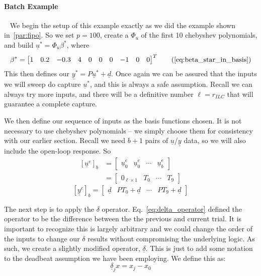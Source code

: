 \FloatBarrier\paragraph{Batch Example}
~\label{par:batch_ex}
We begin the setup of this example exactly as we did the example shown in~\ref{par:fipo}. So we set $p=100$, create a $\Phi_u$ of the first 10 chebyshev polynomials, and build $\underline{u}^\ast = \Phi_u \beta^\ast$, where
\begin{equation}
    \beta^\ast = {\begin{bmatrix}1 & 0.2 & -0.3 & 4 & 0 & 0 & 0 & -1 & 0 & 0\end{bmatrix}}^T
    \tag{\ref{eq:beta_star_in_basis}}
\end{equation}
This then defines our $\underline{y}^\ast = P\underline{u}^\ast + \underline{d}$. Once again we can be assured that the inputs we will sweep do capture $\underline{u}^\ast$, and this is always a safe assumption. Recall we can always try more inputs, and there will be a definitive number $\ell = r_{ILC}$ that will guarantee a complete capture.

We then define our sequence of inputs as the basis functions chosen. It is not necessary to use chebyshev polynomials -- we simply choose them for consistency with our earlier section. Recall we need $b+1$ pairs of $\underline{u}$/$\underline{y}$ data, so we will also include the open-loop response. So
\begin{equation}
    \begin{split}
        {\left[\underline{u}^e\right]}_b  &= 
        \begin{bmatrix}
            \underline{u}_0^e & \underline{u}_0^e & \cdots & \underline{u}_b^e
        \end{bmatrix}
        \\ &= 
        \begin{bmatrix}
            0_{\ell \times 1} & T_0 & \cdots & T_9
        \end{bmatrix}
    \end{split}
\end{equation}
\begin{equation}
    {\left[\underline{y}^e\right]}_b  = 
    \begin{bmatrix}
        \underline{d} & PT_0+\underline{d} & \cdots & PT_9+\underline{d}
    \end{bmatrix}
\end{equation}

The next step is to apply the $\delta$ operator. Eq.~\ref{eq:delta_operator} defined the operator to be the difference between the the previous and current trial. It is important to recognize this is largely arbitrary and we could change the order of the inputs to change our $\delta$ results without compromising the underlying logic. As such, we create a slightly modified operator, $\underline{\delta}$. This is just to add some notation to the deadbeat assumption we have been employing. We define this as:
\begin{equation}
    \underline{\delta}_j x = x_j - x_0
\end{equation}

